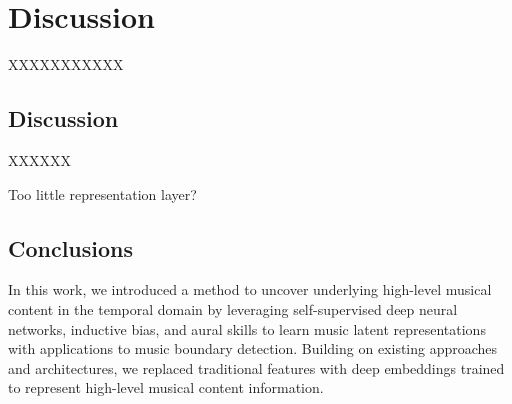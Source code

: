 \chapter{Discussion}

XXXXXXXXXXX

\section{Discussion}

XXXXXX

Too little representation layer?

\section{Conclusions}

In this work, we introduced a method to uncover underlying high-level musical
content in the temporal domain by leveraging self-supervised deep neural networks, inductive bias, and aural skills to learn music latent representations with applications to music boundary detection. Building on existing approaches and architectures, we replaced traditional features with deep embeddings trained to represent high-level musical content information.

\newpage


